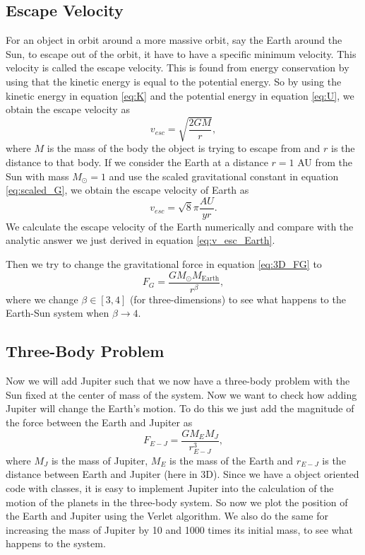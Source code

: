 \documentclass[12pt,a4paper,english]{article}
\begin{document}
\subsection{Escape Velocity}
\label{subsect:Escape vel}
For an object in orbit around a more massive orbit, say the Earth around the Sun, to escape out of the orbit, it have to have a specific minimum velocity. This velocity is called the escape velocity. This is found from energy conservation by using that the kinetic energy is equal to the potential energy. So by using the kinetic energy in equation \ref{eq:K} and the potential energy in equation \ref{eq:U}, we obtain the escape velocity as
\begin{equation}
\label{eq:v_esc}
v_{esc}=\sqrt{\frac{2GM}{r}},
\end{equation}
where $M$ is the mass of the body the object is trying to escape from and $r$ is the distance to that body. If we consider the Earth at a distance $r=1$ AU from the Sun with mass $M_{\odot}=1$ and use the scaled gravitational constant in equation \ref{eq:scaled_G}, we obtain the escape velocity of Earth as 
\begin{equation}
\label{eq:v_esc_Earth}
v_{esc}=\sqrt{8}\pi\frac{AU}{yr}.
\end{equation}
We calculate the escape velocity of the Earth numerically and compare with the analytic answer we just derived in equation \ref{eq:v_esc_Earth}.

Then we try to change the gravitational force in equation \ref{eq:3D_FG} to 
\begin{equation}
\label{eq:change_beta}
F_G=\frac{GM_{\odot}M_{\text{Earth}}}{r^{\beta}},
\end{equation}
where we change $\beta\in[3,4]$ (for three-dimensions) to see what happens to the Earth-Sun system when $\beta\rightarrow4$.

\subsection{Three-Body Problem}
\label{eq:Add Jupiter}
Now we will add Jupiter such that we now have a three-body problem with the Sun fixed at the center of mass of the system. Now we want to check how adding Jupiter will change the Earth's motion. To do this we just add the magnitude of the force between the Earth and Jupiter as
\begin{equation}
\label{eq:Earth-Jupiter}
F_{E-J}=\frac{GM_EM_J}{r^3_{E-J}},
\end{equation}
where $M_J$ is the mass of Jupiter, $M_E$ is the mass of the Earth and $r_{E-J}$ is the distance between Earth and Jupiter (here in 3D). Since we have a object oriented code with classes, it is easy to implement Jupiter into the calculation of the motion of the planets in the three-body system. So now we plot the position of the Earth and Jupiter using the Verlet algorithm. We also do the same for increasing the mass of Jupiter by 10 and 1000 times its initial mass, to see what happens to the system.
\end{document}

